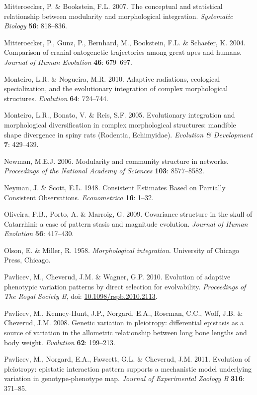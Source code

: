 \documentclass[12pt,]{article}
\begin{document}
Mitteroecker, P. \& Bookstein, F.L. 2007. The conceptual and statistical
relationship between modularity and morphological integration.
\emph{Systematic Biology} \textbf{56}: 818--836.

Mitteroecker, P., Gunz, P., Bernhard, M., Bookstein, F.L. \& Schaefer,
K. 2004. Comparison of cranial ontogenetic trajectories among great apes
and humans. \emph{Journal of Human Evolution} \textbf{46}: 679--697.

Monteiro, L.R. \& Nogueira, M.R. 2010. Adaptive radiations, ecological
specialization, and the evolutionary integration of complex
morphological structures. \emph{Evolution} \textbf{64}: 724--744.

Monteiro, L.R., Bonato, V. \& Reis, S.F. 2005. Evolutionary integration
and morphological diversification in complex morphological structures:
mandible shape divergence in spiny rats (Rodentia, Echimyidae).
\emph{Evolution \& Development} \textbf{7}: 429--439.

Newman, M.E.J. 2006. Modularity and community structure in networks.
\emph{Proceedings of the National Academy of Sciences} \textbf{103}:
8577--8582.

Neyman, J. \& Scott, E.L. 1948. Consistent Estimates Based on Partially
Consistent Observations. \emph{Econometrica} \textbf{16}: 1--32.

Oliveira, F.B., Porto, A. \& Marroig, G. 2009. Covariance structure in
the skull of Catarrhini: a case of pattern stasis and magnitude
evolution. \emph{Journal of Human Evolution} \textbf{56}: 417--430.

Olson, E. \& Miller, R. 1958. \emph{Morphological integration}.
University of Chicago Press, Chicago.

Pavlicev, M., Cheverud, J.M. \& Wagner, G.P. 2010. Evolution of adaptive
phenotypic variation patterns by direct selection for evolvability.
\emph{Proceedings of The Royal Society B}, doi:
\href{http://dx.doi.org/10.1098/rspb.2010.2113}{10.1098/rspb.2010.2113}.

Pavlicev, M., Kenney-Hunt, J.P., Norgard, E.A., Roseman, C.C., Wolf,
J.B. \& Cheverud, J.M. 2008. Genetic variation in pleiotropy:
differential epistasis as a source of variation in the allometric
relationship between long bone lengths and body weight. \emph{Evolution}
\textbf{62}: 199--213.

Pavlicev, M., Norgard, E.A., Fawcett, G.L. \& Cheverud, J.M. 2011.
Evolution of pleiotropy: epistatic interaction pattern supports a
mechanistic model underlying variation in genotype-phenotype map.
\emph{Journal of Experimental Zoology B} \textbf{316}: 371--85.
\end{document}
